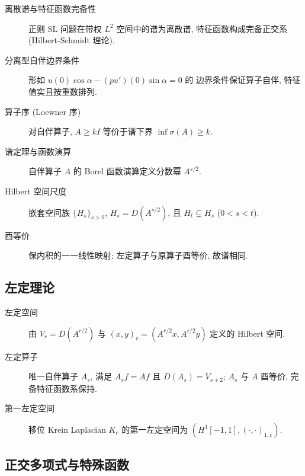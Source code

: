 \documentclass[UTF8]{ctexart}
\begin{document}
\begin{description}
	\item[离散谱与特征函数完备性] 正则 SL 问题在带权 $L^2$ 空间中的谱为离散谱,
		特征函数构成完备正交系 (Hilbert-Schmidt 理论).
	\item[分离型自伴边界条件] 形如 $u(0)\cos\alpha - (pu')(0)\sin\alpha = 0$ 的
		边界条件保证算子自伴, 特征值实且按重数排列.
	\item[算子序 (Loewner 序)] 对自伴算子, $A \geq kI$ 等价于谱下界
		$\inf\sigma(A) \geq k$.
	\item[谱定理与函数演算] 自伴算子 $A$ 的 Borel 函数演算定义分数幂 $A^{s/2}$.
	\item[Hilbert 空间尺度] 嵌套空间族 $\{H_s\}_{s>0}$,
		$H_s = D(A^{s/2})$, 且 $H_t \subsetneq H_s$ ($0 < s < t$).
	\item[酉等价] 保内积的一一线性映射; 左定算子与原算子酉等价, 故谱相同.
\end{description}

\subsection{左定理论}

\begin{description}
	\item[左定空间] 由 $V_r = D(A^{r/2})$ 与 $(x, y)_r = (A^{r/2}x, A^{r/2}y)$
		定义的 Hilbert 空间.
	\item[左定算子] 唯一自伴算子 $A_s$, 满足 $A_s f = Af$ 且 $D(A_s) = V_{s+2}$;
		$A_s$ 与 $A$ 酉等价, 完备特征函数系保持.
	\item[第一左定空间] 移位 Krein Laplacian $K_c$ 的第一左定空间为
		$(H^1[-1,1], (\cdot, \cdot)_{1,c})$.
\end{description}

\subsection{正交多项式与特殊函数}
\end{document}
